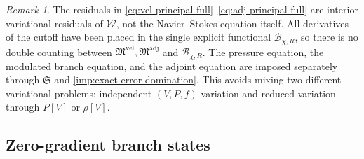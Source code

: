 \documentclass[11pt]{amsart}
\numberwithin{equation}{section}
\theoremstyle{plain}
\theoremstyle{definition}
\theoremstyle{remark}
\newtheorem{remark}[theorem]{Remark}
\newcommand{\Wloc}{\mathcal W}
\newcommand{\State}{\mathfrak S}
\begin{document}
\begin{remark}\label{rem:no-hidden-terms}
The residuals in \eqref{eq:vel-principal-full}--\eqref{eq:adj-principal-full}
are interior variational residuals of \(\Wloc\), not the Navier--Stokes
equation itself.  All derivatives of the cutoff have been placed in the
single explicit functional \(\mathcal B_{\chi,R}\), so there is no double
counting between \(\mathfrak M^{\mathrm{vel}},\mathfrak M^{\mathrm{adj}}\)
and \(\mathcal B_{\chi,R}\).  The pressure equation, the modulated branch
equation, and the adjoint equation are imposed separately through \(\State\)
and \cref{imp:exact-error-domination}.  This avoids mixing two different
variational problems: independent \((V,P,f)\) variation and reduced
variation through \(P[V]\) or \(\rho[V]\).
\end{remark}

\subsection{Zero-gradient branch states}
\end{document}
